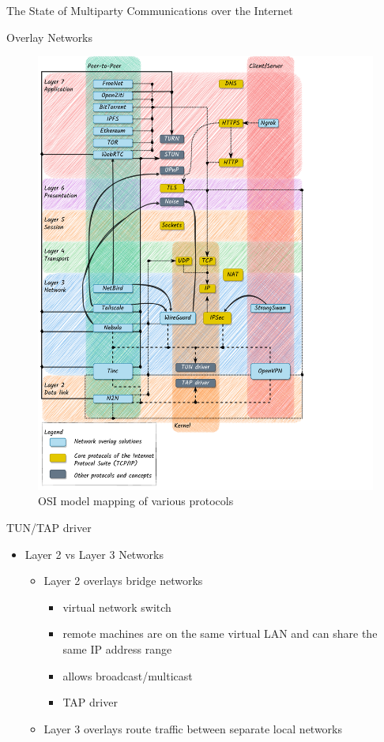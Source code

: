 \begin{frame}[fragile]{The State of Multiparty Communications over the
Internet}
\begin{block}{Overlay Networks}
\begin{figure}
\centering
\includegraphics[width=\textwidth,height=0.9\textheight]{thesis/../figures/osi-map-overlays.drawio.pdf}
\caption{OSI model mapping of various protocols
\label{osi-map-overlays}}
\end{figure}

\begin{block}{TUN/TAP driver}
\protect\hypertarget{tuntap-driver}{}
\begin{itemize}
\tightlist
\item
  Layer 2 vs Layer 3 Networks

  \begin{itemize}
  \tightlist
  \item
    Layer 2 overlays bridge networks

    \begin{itemize}
    \tightlist
    \item
      virtual network switch
    \item
      remote machines are on the same virtual LAN and can share the same
      IP address range
    \item
      allows broadcast/multicast
    \item
      TAP driver
    \end{itemize}
  \item
    Layer 3 overlays route traffic between separate local networks


\end{itemize}
\end{itemize}
\end{block}
\end{block}
\end{frame}
